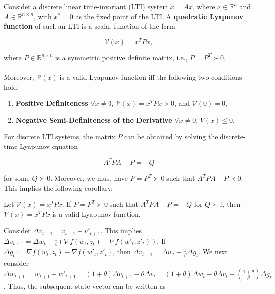 \documentclass[twoside,11pt]{article}
\begin{document}
\begin{definition}
Consider a discrete linear time-invariant (LTI) system $\dot{x} = Ax$, where $x \in \mathbb{R}^n$ and $A \in \mathbb{R}^{n \times n}$, with $x^* = 0$ as the fixed point of the LTI. A \textbf{quadratic Lyapunov function} of such an LTI is a scalar function of the form

\begin{equation}
\mathcal{V}(x) = x^T Px,
\end{equation}

\noindent
where $P \in \mathbb{R}^{n \times n}$ is a symmetric positive definite matrix, i.e., $P = P^T \succ 0$. \\
\\
Moreover, $\mathcal{V}(x)$ is a valid Lyapunov function iff the following two conditions hold:

\begin{enumerate}
    \item \textbf{Positive Definiteness} $\forall x \neq 0$, $\mathcal{V}(x) = x^T Px > 0$, and $\mathcal{V}(0)=0$,

    \item \textbf{Negative Semi-Definiteness of the Derivative} $\forall x \neq 0$, $\dot{V}(x) \leq 0$.
\end{enumerate}
\end{definition}

\noindent
For discrete LTI systems, the matrix $P$ can be obtained by solving the discrete-time Lyapunov equation

\begin{equation}
A^TPA - P = -Q
\end{equation}

\noindent
for some $Q \succ 0$. Moreover, we must have $P=P^T \succ 0$ such that $A^TPA - P \prec 0$. This implies the following corollary:

\begin{corollary}
Let $\mathcal{V}(x) = x^T Px$. If $P = P^T \succ 0$ such that $A^TPA - P = -Q$ for $Q \succ 0$, then $\mathcal{V}(x) = x^T Px$ is a valid Lyapunov function.
\end{corollary}

\noindent
Consider $\Delta v_{t+1} = v_{t+1} - v'_{t+1}$. This implies $\Delta v_{t+1} = \Delta w_t - \frac{1}{\beta}(\nabla f(w_t,z_t) - \nabla f (w'_t, z'_t))$. If $\Delta g_t := \nabla f(w_t,z_t) - \nabla f(w'_t, z'_t)$, then $\Delta v_{t+1} = \Delta w_t - \frac{1}{\beta}\Delta g_t$. We next consider $\Delta w_{t+1} = w_{t+1} - w'_{t+1} = (1+\theta)\Delta v_{t+1} - \theta \Delta v_t = (1+\theta)\Delta w_t - \theta \Delta v_t - (\frac{1+\theta}{\beta})\Delta g_t$. Thus, the subsequent state vector can be written as
\end{document}
